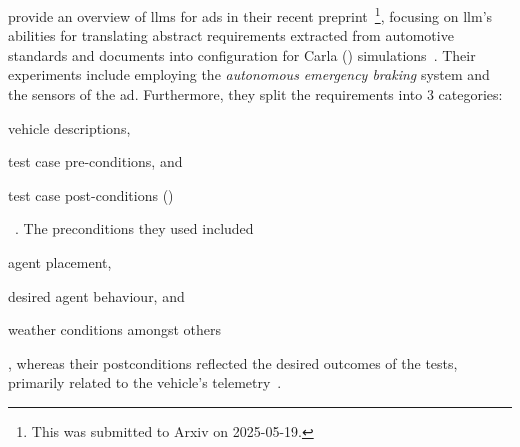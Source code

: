 \citeauthor{requirementsAllYouNeed} provide an overview of \acrshort{llms} for \acrshort{ads} in
their recent preprint~\footnote{This was submitted to Arxiv on
    2025-05-19.}, focusing on \acrshort{llm}'s abilities for translating abstract requirements extracted
from automotive standards and documents into configuration for Carla ()
simulations~\cite{requirementsAllYouNeed}. Their experiments include employing the
\textit{autonomous emergency braking} system and the sensors of the \acrshort{ad}. Furthermore, they
split the requirements into \num{3} categories: \begin{inparaenum}
    \item vehicle descriptions,
    \item test case pre-conditions, and
    \item test case post-conditions ()
\end{inparaenum}~\cite{requirementsAllYouNeed}. The preconditions they used included
\begin{inparaenum}
    \item agent placement,
    \item desired agent behaviour, and
    \item weather conditions amongst others\end{inparaenum}, whereas their postconditions reflected
the desired outcomes of the tests, primarily related to the vehicle's
telemetry~\cite{requirementsAllYouNeed}.
